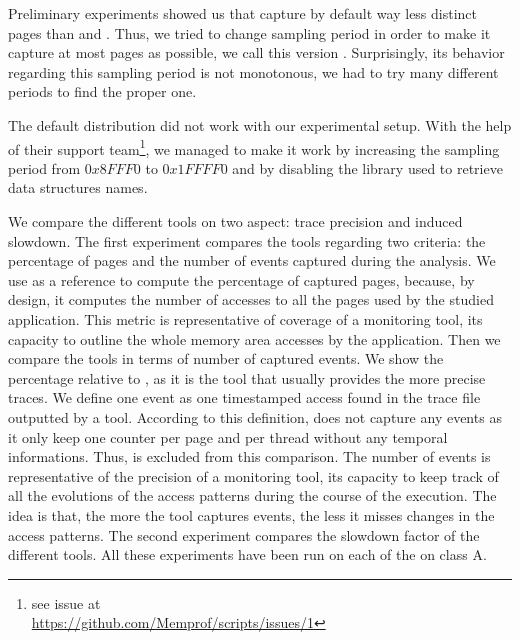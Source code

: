 Preliminary experiments showed us that \Mitos capture by
default way less distinct pages than \TABARNAC and \Moca. Thus, we tried to change \Mitos
sampling period in order to make it capture at most pages as possible, 
we call this version \MitosTun. Surprisingly, its behavior regarding this sampling period
is not monotonous, we had to try many different periods to find the proper one.

The default \MemProf distribution did not work with our experimental setup. With the help
of their support team\footnote{see issue at\\\url{https://github.com/Memprof/scripts/issues/1}}, we managed to make it work by increasing the sampling period
from  $0x8FFF0$ to $0x1FFFF0$ and by disabling the library used to retrieve
data structures names.


We compare the different tools on two aspect: trace precision and induced slowdown. The first experiment compares the tools regarding two criteria:  the
percentage of pages and the number of events captured during the analysis.  We use \TABARNAC as a reference to compute the percentage of captured pages,
because, by design, it computes the number of accesses to all the pages used by the studied application. This metric is representative of coverage of a
monitoring tool, its capacity to outline the whole memory area accesses by the application. Then we compare the tools in terms of number of
captured events.  We show the percentage relative to \Moca, as it is the tool that usually provides the more precise traces. We define one event as one
timestamped access found in the trace file outputted by a tool. According to this definition, \TABARNAC does not capture any events as it only keep one
counter per page and per thread without any temporal informations. Thus, \TABARNAC is excluded from this comparison. The number of events is representative
of the precision of a monitoring tool, its capacity to keep track of all the evolutions of the access patterns during the course of the execution. The idea is
that, the more the tool captures events, the less it misses changes in the access patterns.
The second experiment compares the
slowdown factor of the different tools.  All these experiments have been run on each of the \NPB on class A.

